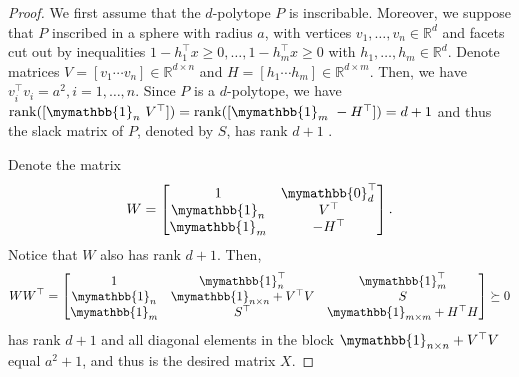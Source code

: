 \documentclass[smallextended, envcountsame]{svjour3}
\begin{document}
    \begin{proof}
        We first assume that the $d$-polytope $P$ is inscribable.  Moreover, we suppose that $P$ inscribed in a sphere with radius $a$, with vertices $v_1,\ldots,v_n\in\mathbb{R}^d$ and facets cut out by inequalities $1-h_1^\top x\ge 0,\ldots,1-h_m^\top x\ge 0$ with $h_1,\ldots,h_m\in\mathbb{R}^d$.  Denote matrices $V=[v_1\cdots v_n]\in\mathbb{R}^{d\times n}$ and $H=[h_1\cdots h_m]\in\mathbb{R}^{d\times m}$.  Then, we have $v_i^\top v_i=a^2,i=1,\ldots,n$.  Since $P$ is a $d$-polytope, we have $\mathrm{rank}([\mymathbb{1}_n~V^\top])=\mathrm{rank}([\mymathbb{1}_m~-H^\top])=d+1$ and thus the slack matrix of $P$, denoted by $S$, has rank $d+1$ \cite[Theorem 14]{gouveia2013nonnegative}.  
        
        Denote the matrix
        \begin{equation*}
            W = \begin{bmatrix}
                1 & \mymathbb{0}_d^\top\\
                \mymathbb{1}_n & V^\top\\
                \mymathbb{1}_m & -H^\top
            \end{bmatrix}.
        \end{equation*}
        Notice that $W$ also has rank $d+1$.  Then,
        \begin{equation*}
            WW^\top = \begin{bmatrix}
                1 & \mymathbb{1}_n^\top & \mymathbb{1}_m^\top\\
                \mymathbb{1}_n & \mymathbb{1}_{n\times n}+V^\top V & S\\
                \mymathbb{1}_m & S^\top & \mymathbb{1}_{m\times m}+H^\top H
            \end{bmatrix}\succeq 0
        \end{equation*}
        has rank $d+1$ and all diagonal elements in the block $\mymathbb{1}_{n\times n}+V^\top V$ equal $a^2+1$, and thus is the desired matrix $X$.


\end{proof}
\end{document}
